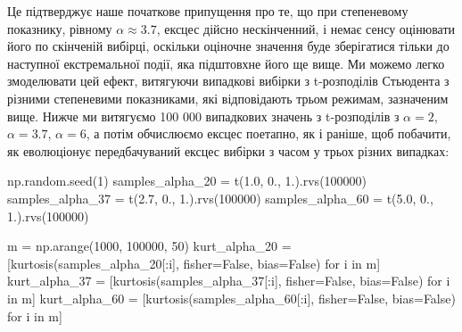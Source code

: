 \documentclass[
  letterpaper,
]{report}
\newenvironment{Shaded}{\begin{snugshade}}{\end{snugshade}}
\newcommand{\ControlFlowTok}[1]{\textcolor[rgb]{0.00,0.23,0.31}{#1}}
\newcommand{\DecValTok}[1]{\textcolor[rgb]{0.68,0.00,0.00}{#1}}
\newcommand{\FloatTok}[1]{\textcolor[rgb]{0.68,0.00,0.00}{#1}}
\newcommand{\KeywordTok}[1]{\textcolor[rgb]{0.00,0.23,0.31}{#1}}
\newcommand{\NormalTok}[1]{\textcolor[rgb]{0.00,0.23,0.31}{#1}}
\newcommand{\OperatorTok}[1]{\textcolor[rgb]{0.37,0.37,0.37}{#1}}
\newcommand{\VariableTok}[1]{\textcolor[rgb]{0.07,0.07,0.07}{#1}}
\begin{document}
Це підтверджує наше початкове припущення про те, що при степеневому
показнику, рівному \(\alpha \approx 3.7\), ексцес дійсно нескінченний, і
немає сенсу оцінювати його по скінченій вибірці, оскільки оціночне
значення буде зберігатися тільки до наступної екстремальної події, яка
підштовхне його ще вище. Ми можемо легко змоделювати цей ефект,
витягуючи випадкові вибірки з t-розподілів Стьюдента з різними
степеневими показниками, які відповідають трьом режимам, зазначеним
вище. Нижче ми витягуємо 100 000 випадкових значень з t-розподілів з
\(\alpha = 2\), \(\alpha = 3.7\), \(\alpha = 6\), а потім обчислюємо
ексцес поетапно, як і раніше, щоб побачити, як еволюціонує
передбачуваний ексцес вибірки з часом у трьох різних випадках:

\begin{Shaded}
\begin{Highlighting}[]
\NormalTok{np.random.seed(}\DecValTok{1}\NormalTok{)}
\NormalTok{samples\_alpha\_20 }\OperatorTok{=}\NormalTok{ t(}\FloatTok{1.0}\NormalTok{, }\FloatTok{0.}\NormalTok{, }\FloatTok{1.}\NormalTok{).rvs(}\DecValTok{100000}\NormalTok{)}
\NormalTok{samples\_alpha\_37 }\OperatorTok{=}\NormalTok{ t(}\FloatTok{2.7}\NormalTok{, }\FloatTok{0.}\NormalTok{, }\FloatTok{1.}\NormalTok{).rvs(}\DecValTok{100000}\NormalTok{)}
\NormalTok{samples\_alpha\_60 }\OperatorTok{=}\NormalTok{ t(}\FloatTok{5.0}\NormalTok{, }\FloatTok{0.}\NormalTok{, }\FloatTok{1.}\NormalTok{).rvs(}\DecValTok{100000}\NormalTok{)}
\end{Highlighting}
\end{Shaded}

\begin{Shaded}
\begin{Highlighting}[]
\NormalTok{m }\OperatorTok{=}\NormalTok{ np.arange(}\DecValTok{1000}\NormalTok{, }\DecValTok{100000}\NormalTok{, }\DecValTok{50}\NormalTok{)}
\NormalTok{kurt\_alpha\_20 }\OperatorTok{=}\NormalTok{ [kurtosis(samples\_alpha\_20[:i], fisher}\OperatorTok{=}\VariableTok{False}\NormalTok{, bias}\OperatorTok{=}\VariableTok{False}\NormalTok{) }\ControlFlowTok{for}\NormalTok{ i }\KeywordTok{in}\NormalTok{ m]}
\NormalTok{kurt\_alpha\_37 }\OperatorTok{=}\NormalTok{ [kurtosis(samples\_alpha\_37[:i], fisher}\OperatorTok{=}\VariableTok{False}\NormalTok{, bias}\OperatorTok{=}\VariableTok{False}\NormalTok{) }\ControlFlowTok{for}\NormalTok{ i }\KeywordTok{in}\NormalTok{ m]}
\NormalTok{kurt\_alpha\_60 }\OperatorTok{=}\NormalTok{ [kurtosis(samples\_alpha\_60[:i], fisher}\OperatorTok{=}\VariableTok{False}\NormalTok{, bias}\OperatorTok{=}\VariableTok{False}\NormalTok{) }\ControlFlowTok{for}\NormalTok{ i }\KeywordTok{in}\NormalTok{ m]}
\end{Highlighting}
\end{Shaded}
\end{document}
